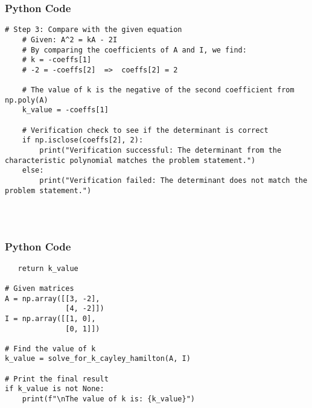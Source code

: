 \documentclass{beamer}
\begin{document}
\begin{frame}[fragile]
    \frametitle{Python Code }
    \begin{lstlisting}
# Step 3: Compare with the given equation
    # Given: A^2 = kA - 2I
    # By comparing the coefficients of A and I, we find:
    # k = -coeffs[1]
    # -2 = -coeffs[2]  =>  coeffs[2] = 2

    # The value of k is the negative of the second coefficient from np.poly(A)
    k_value = -coeffs[1]
    
    # Verification check to see if the determinant is correct
    if np.isclose(coeffs[2], 2):
        print("Verification successful: The determinant from the characteristic polynomial matches the problem statement.")
    else:
        print("Verification failed: The determinant does not match the problem statement.")
        
 


    \end{lstlisting}
\end{frame}

\begin{frame}[fragile]
    \frametitle{Python Code }
    \begin{lstlisting}
   return k_value

# Given matrices
A = np.array([[3, -2],
              [4, -2]])
I = np.array([[1, 0],
              [0, 1]])

# Find the value of k
k_value = solve_for_k_cayley_hamilton(A, I)

# Print the final result
if k_value is not None:
    print(f"\nThe value of k is: {k_value}")


        \end{lstlisting}
\end{frame}
\end{document}

